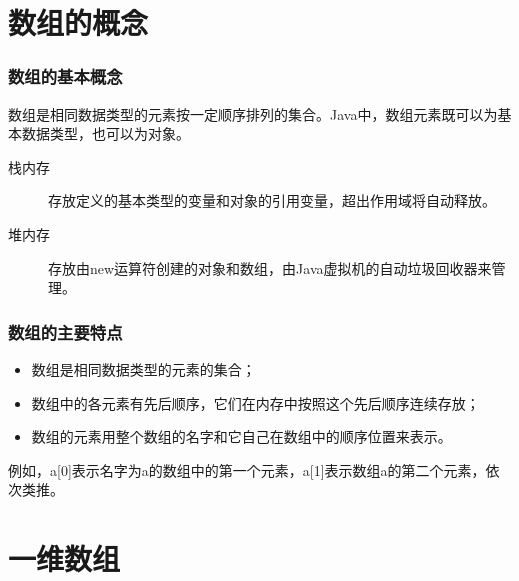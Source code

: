 \section{数组的概念}

\begin{frame}[fragile] %
  \frametitle{数组的基本概念}

  {\hei 数组是相同数据类型的元素按一定顺序排列的集合。}Java中，数组元素既可以为基本数据类型，也可以为对象。

  
  \begin{description}
  \item [栈内存] 存放定义的基本类型的变量和对象的引用变量，超出作用域将自动释放。
  \item [堆内存] 存放由new运算符创建的对象和数组，由Java虚拟机的自动垃圾回收器来管理。
  \end{description}
\end{frame}

\begin{frame}[fragile]
  \frametitle{数组的主要特点}
  \begin{itemize}
  \item 数组是相同数据类型的元素的集合；
  \item 数组中的各元素有先后顺序，它们在内存中按照这个先后顺序连续存放；
  \item 数组的元素用整个数组的名字和它自己在数组中的顺序位置来表示。
  \end{itemize}

  {\Blue\kai 例如，a[0]表示名字为a的数组中的第一个元素，a[1]表示数组a的第二个元素，依次类推。}

\end{frame}

\section{一维数组}

